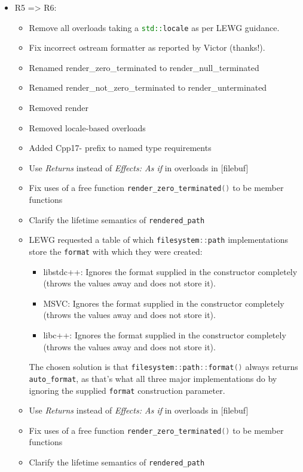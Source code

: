 \documentclass[11pt]{article}
\newcommand{\code}[2][cpp]{\lstinline[language=#1,basicstyle=\small\ttfamily]{#2}}
\begin{document}
\begin{itemize}
    \item R5 => R6:
    \begin{itemize}
    \item Remove all overloads taking a \code{std::locale} as per LEWG guidance.
    \item Fix incorrect ostream formatter as reported by Victor (thanks!). 
    \item Renamed render_zero_terminated to render_null_terminated
    \item Renamed render_not_zero_terminated to render_unterminated
    \item Removed render
    \item Removed locale-based overloads
    \item Added Cpp17- prefix to named type requirements
    \item Use \emph{Returns} instead of \emph{Effects: As if} in overloads in [filebuf]
    \item Fix uses of a free function \code{render_zero_terminated()} to be member functions
    \item Clarify the lifetime semantics of \code{rendered_path}
    \item LEWG requested a table of which \code{filesystem::path} implementations store
    the \code{format} with which they were created:
    \begin{itemize}
      \item libstdc++: Ignores the format supplied in the constructor completely
      (throws the values away and does not store it).\\
      \item MSVC: Ignores the format supplied in the constructor completely
      (throws the values away and does not store it).\\
      \item libc++: Ignores the format supplied in the constructor completely
      (throws the values away and does not store it).\\
    \end{itemize}
    The chosen solution is that \code{filesystem::path::format()} always
    returns \code{auto_format}, as that's what all three major implementations
    do by ignoring the supplied \code{format} construction parameter.
    \item Use \emph{Returns} instead of \emph{Effects: As if} in overloads in [filebuf]
    \item Fix uses of a free function \code{render_zero_terminated()} to be member functions
    \item Clarify the lifetime semantics of \code{rendered_path}
    \end{itemize}


\end{itemize}
\end{document}
